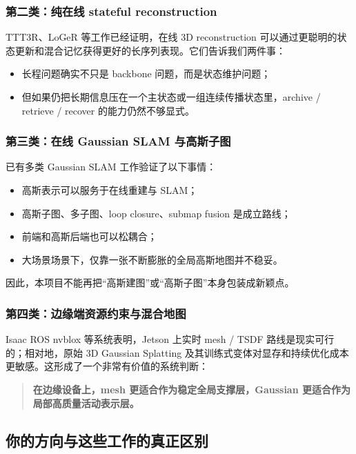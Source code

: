 \documentclass[12pt]{article}
\begin{document}
\subsubsection{第二类：纯在线 stateful reconstruction}

TTT3R、LoGeR 等工作已经证明，在线 3D reconstruction 可以通过更聪明的状态更新和混合记忆获得更好的长序列表现。它们告诉我们两件事：
\begin{itemize}
  \item 长程问题确实不只是 backbone 问题，而是状态维护问题；
  \item 但如果仍把长期信息压在一个主状态或一组连续传播状态里，archive / retrieve / recover 的能力仍然不够显式。
\end{itemize}

\subsubsection{第三类：在线 Gaussian SLAM 与高斯子图}

已有多类 Gaussian SLAM 工作验证了以下事情：
\begin{itemize}
  \item 高斯表示可以服务于在线重建与 SLAM；
  \item 高斯子图、多子图、loop closure、submap fusion 是成立路线；
  \item 前端和高斯后端也可以松耦合；
  \item 大场景场景下，仅靠一张不断膨胀的全局高斯地图并不稳妥。
\end{itemize}

因此，本项目不能再把“高斯建图”或“高斯子图”本身包装成新颖点。

\subsubsection{第四类：边缘端资源约束与混合地图}

Isaac ROS nvblox 等系统表明，Jetson 上实时 mesh / TSDF 路线是现实可行的；相对地，原始 3D Gaussian Splatting 及其训练式变体对显存和持续优化成本更敏感。这形成了一个非常有价值的系统判断：
\begin{quote}
\textbf{在边缘设备上，mesh 更适合作为稳定全局支撑层，Gaussian 更适合作为局部高质量活动表示层。}
\end{quote}

\subsection{你的方向与这些工作的真正区别}
\end{document}
